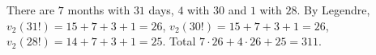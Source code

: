 There are $7$ months with $31$ days, $4$ with $30$ and $1$ with $28$. By Legendre, $v_2(31!)=15+7+3+1=26$, $v_2(30!)=15+7+3+1=26$, $v_2(28!)=14+7+3+1=25$. Total $7\cdot26+4\cdot26+25=\boxed{311}$.
